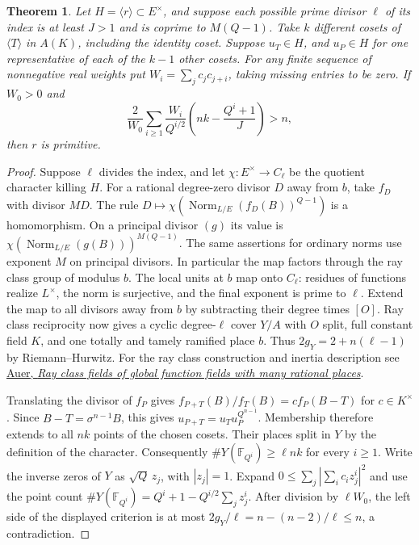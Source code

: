 \documentclass[11pt]{article}
\newtheorem{theorem}{Theorem}
\begin{document}
\begin{theorem}\label{thm:elliptic-ray}
Let \(H=\langle r\rangle\subset E^\times\), and suppose each possible
prime divisor \(\ell\) of its index is at least \(J>1\) and is
coprime to \(M(Q-1)\). Take \(k\) different cosets of
\(\langle T\rangle\) in \(A(K)\), including the identity coset.
Suppose \(u_T\in H\), and \(u_P\in H\) for one representative of each
of the \(k-1\) other cosets. For any finite sequence of nonnegative real
weights put \(W_i=\sum_j c_jc_{j+i}\), taking missing entries to be zero.
If \(W_0>0\) and
\[
 \frac{2}{W_0}\sum_{i\ge1}\frac{W_i}{Q^{i/2}}
                 \left(nk-\frac{Q^i+1}{J}\right)>n ,
\]
then \(r\) is primitive.
\end{theorem}
\begin{proof}
Suppose \(\ell\) divides the index, and let \(\chi:E^\times\to C_\ell\)
be the quotient character killing \(H\). For a rational degree-zero divisor
\(D\) away from \(b\), take \(f_D\) with divisor \(MD\).
The rule \(D\mapsto\chi(\operatorname{Norm}_{L/E}(f_D(B))^{Q-1})\)
is a homomorphism. On a principal divisor \((g)\) its value is
\(\chi(\operatorname{Norm}_{L/E}(g(B)))^{M(Q-1)}\).
The same assertions for ordinary norms use exponent \(M\) on principal
divisors. In particular the map factors through the ray class group
of modulus \(b\). The local units at \(b\) map onto \(C_\ell\):
residues of functions realize \(L^\times\), the norm is surjective,
and the final exponent is prime to \(\ell\). Extend the map to all
divisors away from \(b\) by subtracting their degree times \([O]\).
Ray class reciprocity now gives a cyclic degree-\(\ell\) cover \(Y/A\)
with \(O\) split, full constant field \(K\), and one totally and tamely
ramified place \(b\). Thus \(2g_Y=2+n(\ell-1)\) by Riemann--Hurwitz.
For the ray class construction and inertia description see
\href{https://arxiv.org/abs/math/9803065}{Auer, \emph{Ray class fields
of global function fields with many rational places}}.

Translating the divisor of \(f_P\) gives
\(f_{P+T}(B)/f_T(B)=c f_P(B-T)\) for \(c\in K^\times\).
Since \(B-T=\sigma^{n-1}B\), this gives
\(u_{P+T}=u_T u_P^{Q^{n-1}}\).
Membership therefore extends to all \(nk\) points of the chosen cosets.
Their places split in \(Y\) by the definition of the character.
Consequently \(\#Y(\mathbb F_{Q^i})\ge\ell nk\) for every \(i\ge1\).
Write the inverse zeros of \(Y\) as \(\sqrt Q\,z_j\), with \(|z_j|=1\).
Expand \(0\le\sum_j|\sum_i c_i z_j^i|^2\) and use the point count
\(\#Y(\mathbb F_{Q^i})=Q^i+1-Q^{i/2}\sum_j z_j^i\).
After division by \(\ell W_0\), the left side of the displayed
criterion is at most \(2g_Y/\ell=n-(n-2)/\ell\le n\), a contradiction.
\end{proof}
\end{document}
